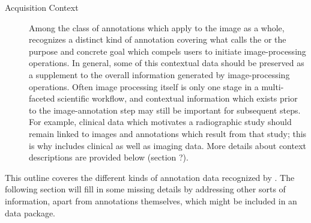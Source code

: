 {\begin{description}
\item[Acquisition Context]  Among the class of 
annotations which apply to the image as a whole, 
\AXFI{} recognizes a distinct kind of annotation 
covering what \AIM{} calls the  
or the purpose and concrete goal which compels 
users to initiate image-processing operations.  
In general, some of this contextual data 
should be preserved as a supplement to 
the overall information generated by image-processing 
operations.  Often image processing itself is only 
one stage in a multi-faceted scientific workflow, 
and contextual information which exists prior to 
the image-annotation step may still be important 
for subsequent steps.  For example, clinical data 
which motivates a radiographic study should remain 
linked to images and annotations which result from 
that study; this is why \DICOMSR{} includes 
clinical as well as imaging data.  More details 
about \AXFI{} context descriptions are provided 
below (section ?). 
\end{description}

This outline coveres the different kinds 
of annotation data recognized by \AXFI{}.  
The following section will fill in some 
missing details by addressing other 
sorts of information, apart from annotations 
themselves, which might be included in an 
\AXFI{} data package.}

